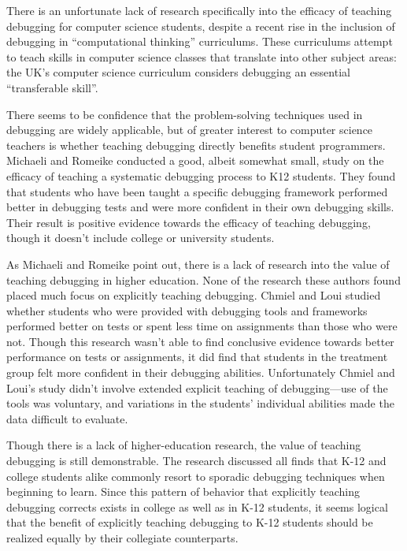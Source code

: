 \documentclass[12pt]{article}
\begin{document}
There is an unfortunate lack of research specifically into the
efficacy of teaching debugging for computer science students, despite
a recent rise in the inclusion of debugging in ``computational
thinking'' curriculums\cite{10.1145/3361721.3361724}.  These
curriculums attempt to teach skills in computer science classes that
translate into other subject areas: the UK's computer science
curriculum considers debugging an essential ``transferable
skill''\cite{10.1145/2602484}.\par There seems to be confidence that
the problem-solving techniques used in debugging are widely
applicable, but of greater interest to computer science teachers is
whether teaching debugging directly benefits student programmers.
Michaeli and Romeike conducted a good, albeit somewhat small, study on
the efficacy of teaching a systematic debugging process to K12
students.  They found that students who have been taught a specific
debugging framework performed better in debugging tests and were more
confident in their own debugging skills\cite{10.1145/3361721.3361724}.
Their result is positive evidence towards the efficacy of teaching
debugging, though it doesn't include college or university
students.\par

As Michaeli and Romeike point out, there is a lack of research into
the value of teaching debugging in higher education.  None of the
research these authors found placed much focus on explicitly teaching
debugging.  Chmiel and Loui studied whether students who were provided
with debugging tools and frameworks performed better on tests or spent
less time on assignments than those who were
not\cite{10.1145/971300.971310}.  Though this research wasn't able to
find conclusive evidence towards better performance on tests or
assignments, it did find that students in the treatment group felt
more confident in their debugging abilities.  Unfortunately Chmiel and
Loui's study didn't involve extended explicit teaching of
debugging---use of the tools was voluntary, and variations in the
students' individual abilities made the data difficult to
evaluate.\par

Though there is a lack of higher-education research, the value of
teaching debugging is still demonstrable.  The research discussed all
finds that K-12 and college students alike commonly resort to sporadic
debugging techniques when beginning to learn.  Since this pattern of
behavior that explicitly teaching debugging corrects exists in college
as well as in K-12 students, it seems logical that the benefit of
explicitly teaching debugging to K-12 students should be realized
equally by their collegiate counterparts.\par
\end{document}
